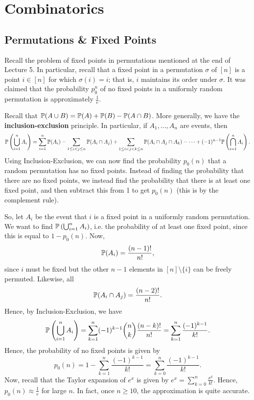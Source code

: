 \documentclass[letterpaper]{article}
\begin{document}
\section{Combinatorics}
\subsection{Permutations \& Fixed Points}
Recall the problem of fixed points in permutations mentioned at the end of Lecture 5. In particular, recall that a fixed point in a permutation $\sigma$ of $[n]$ is a point $i \in [n]$ for which $\sigma(i) = i$; that is, $i$ maintains its order under $\sigma$. It was claimed that the probability $p_{0}^n$ of no fixed points in a uniformly random permutation is approximately $\frac{1}{e}$. 

\bigskip 

Recall that $\mathbb{P}(A \cup B) = \mathbb{P}(A) + \mathbb{P}(B) - \mathbb{P}(A \cap B)$. More generally, we have the \textbf{inclusion-exclusion} principle. In particular, if $A_1, \dots, A_n$ are events, then 
\[\mathbb{P}\left(\bigcup_{i = 1}^{n} A_i\right) = \sum_{i = 1}^{n} \mathbb{P}(A_i) - \sum_{1 \leq i < j \leq n} \mathbb{P}(A_i \cap A_j) + \sum_{1 \leq i < j < k \leq n} \mathbb{P}(A_i \cap A_j \cap A_k) - \dots + (-1)^{n - 1} \mathbb{P}\left(\bigcap_{i = 1}^{n} A_i\right).\]
Using Inclusion-Exclusion, we can now find the probability $p_0(n)$ that a random permutation has no fixed points. Instead of finding the probability that there are no fixed points, we instead find the probability that there is at least one fixed point, and then subtract this from 1 to get $p_0(n)$ (this is by the complement rule).

\bigskip 

So, let $A_i$ be the event that $i$ is a fixed point in a uniformly random permutation. We want to find $\mathbb{P}\left(\bigcup_{i = 1}^{n} A_i\right)$, i.e. the probability of at least one fixed point, since this is equal to $1 - p_0(n)$. Now, 
\[\mathbb{P}(A_i) = \frac{(n - 1)!}{n!},\]
since $i$ must be fixed but the other $n - 1$ elements in $[n] \setminus \{i\}$ can be freely permuted. Likewise, all 
\[\mathbb{P}(A_i \cap A_j) = \frac{(n - 2)!}{n!}.\]
Hence, by Inclusion-Exclusion, we have 
\[\mathbb{P}\left(\bigcup_{i = 1}^{n} A_i\right) = \sum_{k = 1}^{n} (-1)^{k - 1} \binom{n}{k} \frac{(n - k)!}{n!} = \sum_{k = 1}^{n} \frac{(-1)^{k - 1}}{k!}.\]
Hence, the probability of no fixed points is given by 
\[p_0(n) = 1 - \sum_{k = 1}^{n} \frac{(-1)^{k - 1}}{k!} = \sum_{k = 0}^{n} \frac{(-1)^{k - 1}}{k!}.\]
Now, recall that the Taylor expansion of $e^x$ is given by $e^x = \sum_{k = 0}^{n} \frac{x^k}{k!}$. Hence, $p_0(n) \approx \frac{1}{e}$ for large $n$. In fact, once $n \geq 10$, the approximation is quite accurate. 
\end{document}
